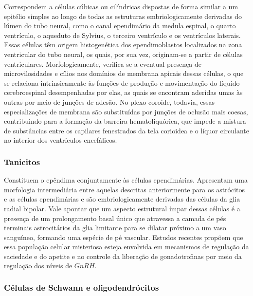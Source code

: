 \documentclass[
]{book}
\theoremstyle{definition}
\theoremstyle{definition}
\theoremstyle{definition}
\theoremstyle{definition}
\theoremstyle{remark}
\begin{document}
Correspondem a células cúbicas ou cilíndricas dispostas de forma similar a um epitélio simples ao longo de todas as estruturas embriologicamente derivadas do lúmen do tubo neural, como o canal ependimário da medula espinal, o quarto ventrículo, o aqueduto de Sylvius, o terceiro ventrículo e os ventrículos laterais. Essas células têm origem histogenética dos ependimoblastos localizados na zona ventricular do tubo neural, os quais, por sua vez, originam-se a partir de células ventriculares. Morfologicamente, verifica-se a eventual presença de microvilosidades e cílios nos domínios de membrana apicais dessas células, o que se relaciona intrinsicamente às funções de produção e movimentação do líquido cerebroespinal desempenhadas por elas, as quais se encontram aderidas umas às outras por meio de junções de adesão. No plexo coroide, todavia, essas especializações de membrana são substituídas por junções de oclusão mais coesas, contribuindo para a formação da barreira hematoliquórica, que impede a mistura de substâncias entre os capilares fenestrados da tela corioidea e o líquor circulante no interior dos ventrículos encefálicos.

\hypertarget{tanicitos}{%
\subsubsection*{Tanicitos}\label{tanicitos}}

Constituem o epêndima conjuntamente às células ependimárias. Apresentam uma morfologia intermediária entre aquelas descritas anteriormente para os astrócitos e as células ependimárias e são embriologicamente derivadas das células da glia radial bipolar. Vale apontar que um aspecto estrutural ímpar dessas células é a presença de um prolongamento basal único que atravessa a camada de pés terminais astrocitários da glia limitante para se dilatar próximo a um vaso sanguíneo, formando uma espécie de pé vascular. Estudos recentes propõem que essa população celular misteriosa esteja envolvida em mecanismos de regulação da saciedade e do apetite e no controle da liberação de gonadotrofinas por meio da regulação dos níveis de \(GnRH\).

\hypertarget{cuxe9lulas-de-schwann-e-oligodendruxf3citos}{%
\subsubsection*{Células de Schwann e oligodendrócitos}\label{cuxe9lulas-de-schwann-e-oligodendruxf3citos}}
\end{document}
